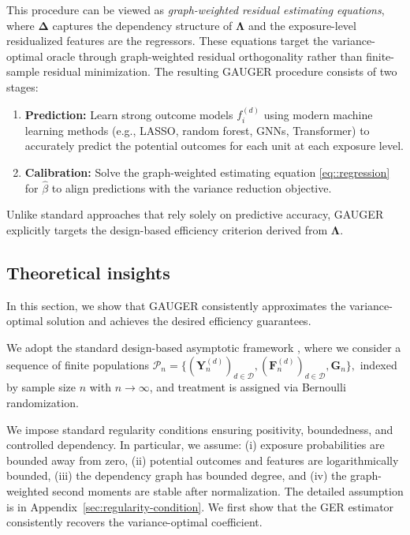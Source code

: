 \documentclass[twoside]{article}
\theoremstyle{plain}
\theoremstyle{definition}
\theoremstyle{remark}
\newcommand{\bY}{\boldsymbol{Y}}
\newcommand{\bG}{\boldsymbol{G}}
\newcommand{\bF}{\boldsymbol{F}}
\newcommand{\bLambda}{\boldsymbol{\Lambda}}
\newcommand{\bDelta}{\boldsymbol{\Delta}}
\newcommand{\cD}{\mathcal{D}}
\begin{document}
This procedure can be viewed as \emph{graph-weighted residual estimating equations}, where $\bDelta$ captures the dependency structure of $\bLambda$ and the exposure-level residualized features are the regressors. These equations target the variance-optimal oracle through graph-weighted residual orthogonality rather than finite-sample residual minimization. The resulting GAUGER procedure consists of two stages:

\begin{enumerate}[label=(S\arabic*)]
\item \textbf{Prediction:} Learn strong outcome models $f_i^{(d)}$ using modern machine learning methods (e.g., LASSO, random forest, GNNs, Transformer) to accurately predict the
potential outcomes for each unit at each exposure level.
\item \textbf{Calibration:} Solve the graph-weighted estimating equation \eqref{eq::regression} for $\hat{\beta}$ to align predictions with the variance reduction objective.
\end{enumerate}

Unlike standard approaches that rely solely on predictive accuracy, GAUGER explicitly targets the design-based efficiency criterion derived from $\bLambda$.

\subsection{Theoretical insights}
In this section, we show  that GAUGER consistently approximates the variance-optimal solution and achieves the desired efficiency guarantees.

We adopt the standard design-based asymptotic framework \citep{ding2024first, aronow2017estimating}, where we consider a sequence of finite populations
$
\mathcal{P}_n = \{(\bY_n^{(d)})_{d\in\cD}, (\bF_n^{(d)})_{d\in\cD}, \bG_n\},
$ indexed by sample size $n$ with $n \to \infty$, and treatment is assigned via Bernoulli randomization.

We impose standard regularity conditions ensuring positivity, boundedness, and controlled dependency. In particular, we assume:
(i) exposure probabilities are bounded away from zero,
(ii) potential outcomes and features are logarithmically bounded,
(iii) the dependency graph has bounded degree, and
(iv) the graph-weighted second moments are stable after normalization.  The detailed assumption is in Appendix~\ref{sec:regularity-condition}. We first show that the GER estimator consistently recovers the variance-optimal coefficient.
\end{document}
